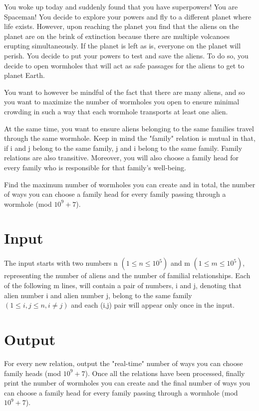 
You woke up today and suddenly found that you have superpowers! You are Spaceman! You decide to explore your powers and fly to a different planet where life exists. However, upon reaching the planet you find that the aliens on the planet are on the brink of extinction because there are multiple volcanoes erupting simultaneously. If the planet is left as is, everyone on the planet will perish. You decide to put your powers to test and save the aliens. To do so, you decide to open wormholes that will act as safe passages for the aliens to get to planet Earth.

You want to however be mindful of the fact that there are many aliens, and so you want to maximize the number of wormholes you open to ensure minimal crowding in such a way that each wormhole transports at least one alien. 

At the same time, you want to ensure aliens belonging to the same families travel through the same wormhole. Keep in mind the "family" relation is mutual in that, if i and j belong to the same family, j and i belong to the same family. Family relations are also transitive. Moreover, you will also choose a family head for every family who is responsible for that family's well-being.

Find the maximum number of wormholes you can create and in total, the number of ways you can choose a family head for every family passing through a wormhole (mod $10^{9}+7$).\newline

\section*{Input}
 \indent 
  The input starts with two numbers n $(1 \le n \le 10^{5})$ and m $(1 \le m \le 10^{5})$, representing the number of aliens and the number of familial relationships. Each of the following m lines, will contain a pair of numbers, i and j, denoting that alien number i and alien number j, belong to the same family $(1 \le i,j \le n, i \neq j)$ and each (i,j) pair will appear only once in the input.
  
\section*{Output}
For every new relation, output the "real-time" number of ways you can choose family heads (mod $10^{9}+7$). Once all the relations have been processed, finally print the number of wormholes you can create and the final number of ways you can choose a family head for every family passing through a wormhole (mod $10^{9}+7$).
